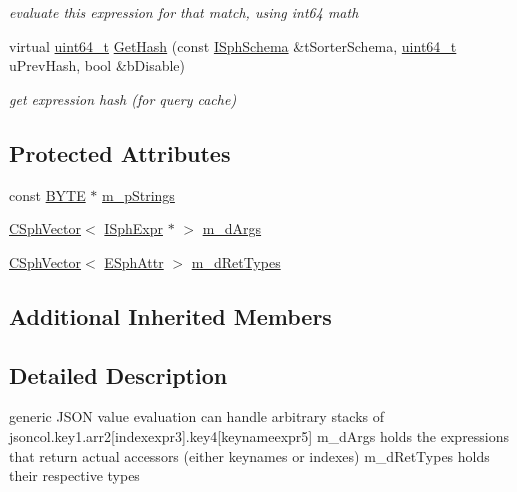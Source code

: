 \begin{DoxyCompactItemize}
\begin{DoxyCompactList}\small\item\em evaluate this expression for that match, using int64 math \end{DoxyCompactList}\item 
virtual \hyperlink{sphinxstd_8h_aaa5d1cd013383c889537491c3cfd9aad}{uint64\-\_\-t} \hyperlink{structExpr__JsonField__c_a3efde7e348ca004dd1a7226d9cc1ab8e}{Get\-Hash} (const \hyperlink{classISphSchema}{I\-Sph\-Schema} \&t\-Sorter\-Schema, \hyperlink{sphinxstd_8h_aaa5d1cd013383c889537491c3cfd9aad}{uint64\-\_\-t} u\-Prev\-Hash, bool \&b\-Disable)
\begin{DoxyCompactList}\small\item\em get expression hash (for query cache) \end{DoxyCompactList}\end{DoxyCompactItemize}
\subsection*{Protected Attributes}
\begin{DoxyCompactItemize}
\item 
const \hyperlink{sphinxstd_8h_a4ae1dab0fb4b072a66584546209e7d58}{B\-Y\-T\-E} $\ast$ \hyperlink{structExpr__JsonField__c_abd3133d98c3d4afe6f24c8366c973d77}{m\-\_\-p\-Strings}
\item 
\hyperlink{classCSphVector}{C\-Sph\-Vector}$<$ \hyperlink{structISphExpr}{I\-Sph\-Expr} $\ast$ $>$ \hyperlink{structExpr__JsonField__c_a290b2a33b4d32cae512157a1b1556fee}{m\-\_\-d\-Args}
\item 
\hyperlink{classCSphVector}{C\-Sph\-Vector}$<$ \hyperlink{sphinxexpr_8h_aa883df0db2e4468a107fdd2d2ae625a3}{E\-Sph\-Attr} $>$ \hyperlink{structExpr__JsonField__c_a2826d27e9090d9b973ee4001e30301a7}{m\-\_\-d\-Ret\-Types}
\end{DoxyCompactItemize}
\subsection*{Additional Inherited Members}


\subsection{Detailed Description}
generic J\-S\-O\-N value evaluation can handle arbitrary stacks of jsoncol.\-key1.\-arr2\mbox{[}indexexpr3\mbox{]}.key4\mbox{[}keynameexpr5\mbox{]} m\-\_\-d\-Args holds the expressions that return actual accessors (either keynames or indexes) m\-\_\-d\-Ret\-Types holds their respective types 

